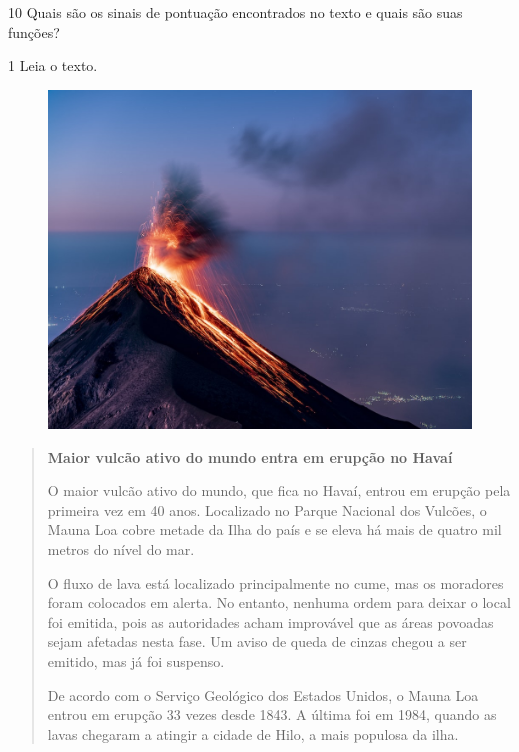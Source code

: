 

\num{10} Quais são os sinais de pontuação encontrados no texto e quais são
suas funções?




\num{1} Leia o texto.

\begin{figure}[htpb!]
\includegraphics[width=.5\textwidth]{./imgs/img9.jpg}
\end{figure}

\begin{quote}
\textbf{Maior vulcão ativo do mundo entra em erupção no Havaí}

O maior vulcão ativo do mundo, que fica no Havaí, entrou em erupção pela primeira vez em 40 anos. Localizado no Parque Nacional dos Vulcões, o Mauna Loa cobre metade da Ilha do país e se eleva há mais de quatro mil metros do nível do mar.

O fluxo de lava está localizado principalmente no cume, mas os moradores foram colocados em alerta. No entanto, nenhuma ordem para deixar o local foi emitida, pois as autoridades acham improvável que as áreas povoadas sejam afetadas nesta fase. Um aviso de queda de cinzas chegou a ser emitido, mas já foi suspenso.

De acordo com o Serviço Geológico dos Estados Unidos, o Mauna Loa entrou em erupção 33 vezes desde 1843. A última foi em 1984, quando as lavas chegaram a atingir a cidade de Hilo, a mais populosa da ilha.

\end{quote}


